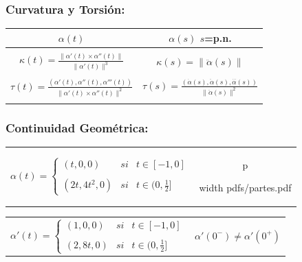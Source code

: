 \documentclass[twoside]{report}
\newcommand{\colocapdf}[2]{\quad\pdfimage width #2 {pdfs/#1.pdf}}
\begin{document}
\subsubsection{Curvatura y Torsión:}

\begin{center}
\begin{tabular}{|c||c|}
\hline
$\alpha(t)$ & $\alpha(s)$ \quad $s$=p.n. \\
\hline \hline
 & \\
$\displaystyle \kappa(t)= \frac{\parallel \alpha'(t)\times\alpha''
(t)\parallel}{\parallel
\alpha'(t)\parallel ^3}$ & $\displaystyle \kappa(s)=\parallel \ddot{\alpha}(s)\parallel$\\
 & \\
$\displaystyle \tau (t)= \frac{(\alpha' (t),\alpha'' (t),\alpha'''
(t))}{\parallel\alpha' (t)\times\alpha'' (t)\parallel^2}$ &
$\displaystyle \tau (s)=\frac{( \dot{\alpha}(s),\ddot{\alpha}(s),
\stackrel{...}{\alpha}(s))}{\parallel \ddot{\alpha}(s)\parallel^2 }$ \\
 & \\
\hline
\end{tabular}
\end{center}

\subsubsection{Continuidad Geométrica:}

\begin{tabular}{cc}
$\alpha(t)=\left\{\begin{array}{ccc}
(t,0,0) & si & t\in [-1,0]\\
 & & \\
(2t,4t^2,0) & si & t\in (0, \frac{1}{2}]
\end{array}\right.$ & p
\begin{minipage}{.4\textwidth}\colocapdf{partes}{\textwidth}\end{minipage}
\end{tabular}

\vspace{0.3cm}

\begin{tabular}{cc}
$\alpha'(t)=\left\{\begin{array}{ccc}
(1,0,0) & si & t\in [-1,0]\\
 & & \\
(2,8t,0) & si & t\in (0, \frac{1}{2}]
\end{array}\right.$ & \hspace{1cm} $\alpha'(0^{-})\neq \alpha'(0^{+})$
\end{tabular}
\end{document}
